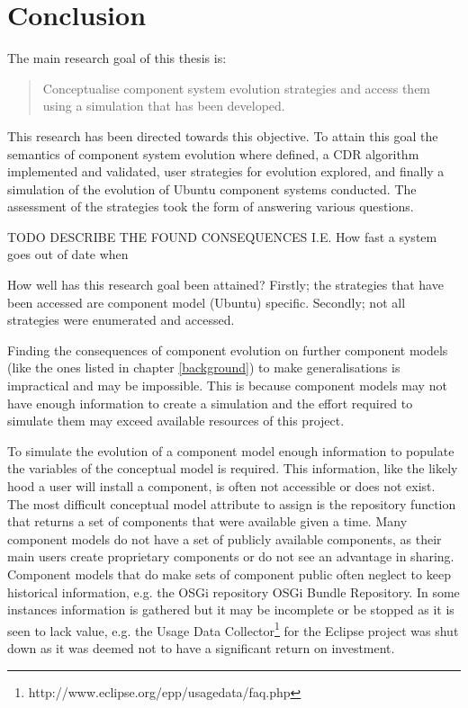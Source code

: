 \chapter{Conclusion}
\label{conclusion}
The main research goal of this thesis is:
\begin{quote}
Conceptualise component system evolution strategies and access them using a simulation that has been developed.
\end{quote}
This research has been directed towards this objective.
To attain this goal the semantics of component system evolution where defined, a CDR algorithm implemented and validated, user strategies for evolution explored,
and finally a simulation of the evolution of Ubuntu component systems conducted.
The assessment of the strategies took the form of answering various questions.

TODO DESCRIBE THE FOUND CONSEQUENCES I.E. How fast a system goes out of date when

How well has this research goal been attained?
Firstly; the strategies that have been accessed are component model (Ubuntu) specific. 
Secondly; not all strategies were enumerated and accessed.

Finding the consequences of component evolution on further component models (like the ones listed in chapter \ref{background}) to make generalisations is impractical and may be impossible.
This is because component models may not have enough information to create a simulation and the effort required to simulate them may exceed available resources of this project.

To simulate the evolution of a component model enough information to populate the variables of the conceptual model is required.
This information, like the likely hood a user will install a component, is often not accessible or does not exist.
The most difficult conceptual model attribute to assign is the repository function that returns a set of components that were available given a time. 
Many component models do not have a set of publicly available components, as their main users create proprietary components or do not see an advantage in sharing.
Component models that do make sets of component public often neglect to keep historical information, e.g. the OSGi repository OSGi Bundle Repository.
In some instances information is gathered but it may be incomplete or be stopped as it is seen to lack value,  
e.g. the Usage Data Collector\footnote{http://www.eclipse.org/epp/usagedata/faq.php} for the Eclipse project was shut down as it was deemed not to have a significant return on investment.  

